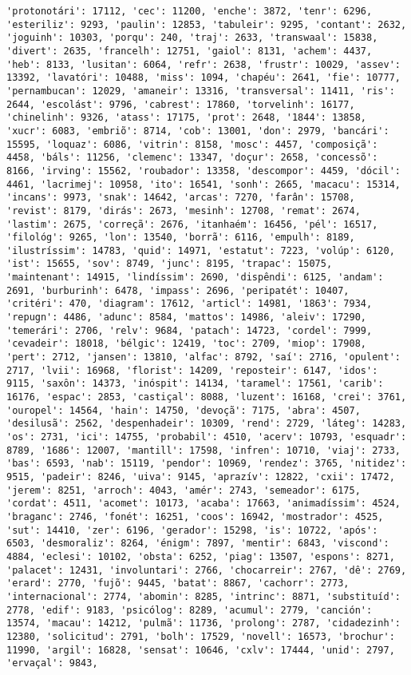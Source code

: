 \documentclass[11pt]{article}
\begin{document}
\begin{Verbatim}[commandchars=\\\{\}]
'protonotári': 17112, 'cec': 11200, 'enche': 3872, 'tenr': 6296, 'esteriliz': 9293, 'paulin': 12853, 'tabuleir': 9295, 'contant': 2632, 'joguinh': 10303, 'porqu': 240, 'traj': 2633, 'transwaal': 15838, 'divert': 2635, 'francelh': 12751, 'gaiol': 8131, 'achem': 4437, 'heb': 8133, 'lusitan': 6064, 'refr': 2638, 'frustr': 10029, 'assev': 13392, 'lavatóri': 10488, 'miss': 1094, 'chapéu': 2641, 'fie': 10777, 'pernambucan': 12029, 'amaneir': 13316, 'transversal': 11411, 'ris': 2644, 'escolást': 9796, 'cabrest': 17860, 'torvelinh': 16177, 'chinelinh': 9326, 'atass': 17175, 'prot': 2648, '1844': 13858, 'xucr': 6083, 'embriõ': 8714, 'cob': 13001, 'don': 2979, 'bancári': 15595, 'loquaz': 6086, 'vitrin': 8158, 'mosc': 4457, 'composiçã': 4458, 'báls': 11256, 'clemenc': 13347, 'doçur': 2658, 'concessõ': 8166, 'irving': 15562, 'roubador': 13358, 'descompor': 4459, 'dócil': 4461, 'lacrimej': 10958, 'ito': 16541, 'sonh': 2665, 'macacu': 15314, 'incans': 9973, 'snak': 14642, 'arcas': 7270, 'farân': 15708, 'revist': 8179, 'dirás': 2673, 'mesinh': 12708, 'remat': 2674, 'lastim': 2675, 'correçã': 2676, 'itanhaém': 16456, 'pél': 16517, 'filológ': 9265, 'lon': 13540, 'borrã': 6116, 'empulh': 8189, 'ilustríssim': 14783, 'quid': 14971, 'estatut': 7223, 'volúp': 6120, 'ist': 15655, 'sov': 8749, 'junc': 8195, 'trapac': 15075, 'maintenant': 14915, 'lindíssim': 2690, 'dispêndi': 6125, 'andam': 2691, 'burburinh': 6478, 'impass': 2696, 'peripatét': 10407, 'critéri': 470, 'diagram': 17612, 'articl': 14981, '1863': 7934, 'repugn': 4486, 'adunc': 8584, 'mattos': 14986, 'aleiv': 17290, 'temerári': 2706, 'relv': 9684, 'patach': 14723, 'cordel': 7999, 'cevadeir': 18018, 'bélgic': 12419, 'toc': 2709, 'miop': 17908, 'pert': 2712, 'jansen': 13810, 'alfac': 8792, 'saí': 2716, 'opulent': 2717, 'lvii': 16968, 'florist': 14209, 'reposteir': 6147, 'idos': 9115, 'saxôn': 14373, 'inóspit': 14134, 'taramel': 17561, 'carib': 16176, 'espac': 2853, 'castiçal': 8088, 'luzent': 16168, 'crei': 3761, 'ouropel': 14564, 'hain': 14750, 'devoçã': 7175, 'abra': 4507, 'desilusã': 2562, 'despenhadeir': 10309, 'rend': 2729, 'láteg': 14283, 'os': 2731, 'ici': 14755, 'probabil': 4510, 'acerv': 10793, 'esquadr': 8789, '1686': 12007, 'mantill': 17598, 'infren': 10710, 'viaj': 2733, 'bas': 6593, 'nab': 15119, 'pendor': 10969, 'rendez': 3765, 'nitidez': 9515, 'padeir': 8246, 'uiva': 9145, 'aprazív': 12822, 'cxii': 17472, 'jerem': 8251, 'arroch': 4043, 'amér': 2743, 'semeador': 6175, 'cordat': 4511, 'acomet': 10173, 'acaba': 17663, 'animadíssim': 4524, 'braganc': 2746, 'fonét': 16251, 'coos': 16942, 'mostrador': 4525, 'sut': 14410, 'zer': 6196, 'gerador': 15298, 'is': 10722, 'após': 6503, 'desmoraliz': 8264, 'énigm': 7897, 'mentir': 6843, 'viscond': 4884, 'eclesi': 10102, 'obsta': 6252, 'piag': 13507, 'espons': 8271, 'palacet': 12431, 'involuntari': 2766, 'chocarreir': 2767, 'dê': 2769, 'erard': 2770, 'fujõ': 9445, 'batat': 8867, 'cachorr': 2773, 'internacional': 2774, 'abomin': 8285, 'intrinc': 8871, 'substituíd': 2778, 'edif': 9183, 'psicólog': 8289, 'acumul': 2779, 'canción': 13574, 'macau': 14212, 'pulmã': 11736, 'prolong': 2787, 'cidadezinh': 12380, 'solicitud': 2791, 'bolh': 17529, 'novell': 16573, 'brochur': 11990, 'argil': 16828, 'sensat': 10646, 'cxlv': 17444, 'unid': 2797, 'ervaçal': 9843, 
\end{Verbatim}
\end{document}
